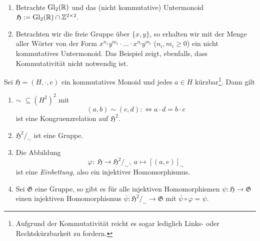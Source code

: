 \begin{example} {\ }
    \begin{enumerate}
        \item Betrachte $\operatorname{Gl}_2(\mathbb{R})$ und das (nicht kommutative) Untermonoid $\mathfrak{H} := \operatorname{Gl}_2(\mathbb{R}) \cap \mathbb{Z}^{2 \times 2}$.
        \item Betrachten wir die freie Gruppe über $\{x,y\}$, so erhalten wir mit der Menge aller Wörter von der Form $x^{n_1} y^{m_1} \cdot ... \cdot x^{n_l} y^{m_l}$ ($n_i, m_i \geq 0$)
        ein nicht kommutatives Untermonoid. Das Beispiel zeigt, ebenfalls, dass Kommutativität nicht notwendig ist.
    \end{enumerate}
\end{example}

\begin{theorem}\label{theorem:monoid-gruppe-einbettung}
    Sei $\mathfrak{H} = (H, \cdot, e)$ ein kommutatives Monoid und jedes $a \in H$ kürzbar\footnote{Aufgrund der Kommutativität reicht es sogar lediglich Links- oder Rechtskürzbarkeit zu fordern.}. Dann gilt
    \begin{enumerate}
        \item $\sim\; \subseteq (H^2)^2$ mit
        $$ (a,b) \sim (c,d) :\Leftrightarrow a \cdot d = b \cdot c $$
        ist eine Kongruenzrelation auf $\mathfrak{H}^2$.
        \item $\mathfrak{H}^2 /_\sim$ ist eine Gruppe.
        \item Die Abbildung
        $$ \varphi :\; \mathfrak{H} \to \mathfrak{H}^2 /_\sim, \;a \mapsto [(a,e)]_\sim $$
        ist eine \emph{Einbettung}, also ein injektiver Homomorphismus.
        \item Sei $\mathfrak{G}$ eine Gruppe, so gibt es für alle injektiven Homomorphismen $\psi : \mathfrak{H} \to \mathfrak{G}$ einen injektiven Homomorphismus $\overline{\psi} : \mathfrak{H}^2 /_\sim \to \mathfrak{G}$ mit $\overline{\psi} \circ \varphi = \psi$.
    \end{enumerate}

    \begin{figure}[H]
        \centering
\end{figure}
\end{theorem}
